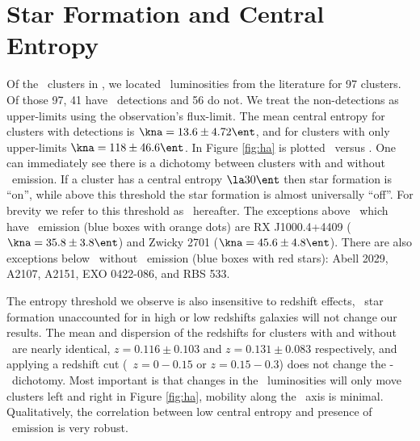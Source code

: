 \documentclass{emulateapj}
\begin{document}

\section{Star Formation and Central Entropy}
\label{sec:sf}

Of the \clnum\ clusters in \accept, we located \halpha\ luminosities
from the literature for 97 clusters. Of those 97, 41 have
\halpha\ detections and 56 do not. We treat the non-detections as
upper-limits using the observation's flux-limit. The mean central
entropy for clusters with detections is $\kna = 13.6 \pm 4.72 \ent$,
and for clusters with only upper-limits $\kna = 118 \pm 46.6 \ent$. In
Figure \ref{fig:ha} is plotted \lha\ versus \kna. One can immediately
see there is a dichotomy between clusters with and without
\halpha\ emission. If a cluster has a central entropy $\la 30 \ent$
then star formation is ``on'', while above this threshold the star
formation is almost universally ``off''. For brevity we refer to this
threshold as \kthr\ hereafter. The exceptions above \kthr\ which have
\halpha\ emission (blue boxes with orange dots) are RX J1000.4+4409
($\kna = 35.8 \pm 3.8 \ent$) and Zwicky 2701 ($\kna = 45.6 \pm 4.8
\ent$).  There are also exceptions below \kthr\ without
\halpha\ emission (blue boxes with red stars): Abell 2029, A2107,
A2151, EXO 0422-086, and RBS 533.

The entropy threshold we observe is also insensitive to redshift
effects, \ie\ star formation unaccounted for in high or low redshifts
galaxies will not change our results. The mean and dispersion of the
redshifts for clusters with and without \halpha\ are nearly identical,
$z = 0.116 \pm 0.103$ and $z = 0.131 \pm 0.083$ respectively, and
applying a redshift cut (\ie\ $z = 0-0.15$ or $z = 0.15-0.3$) does not
change the \kna-\halpha\ dichotomy. Most important is that changes in
the \halpha\ luminosities will only move clusters left and right in
Figure \ref{fig:ha}, mobility along the \kna\ axis is
minimal. Qualitatively, the correlation between low central entropy
and presence of \halpha\ emission is very robust.
\end{document}

